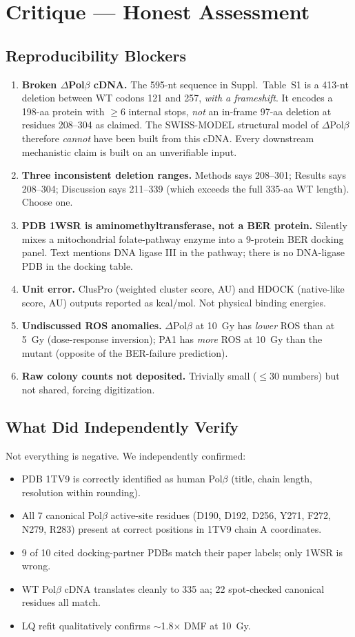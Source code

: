 \documentclass[11pt]{article}
\begin{document}
\section{Critique --- Honest Assessment}
\subsection{Reproducibility Blockers}
\begin{enumerate}
  \item \textbf{Broken $\Delta$Pol$\beta$ cDNA.} The 595-nt sequence in Suppl.\ Table~S1 is a 413-nt deletion between WT codons 121 and 257, \emph{with a frameshift}. It encodes a 198-aa protein with $\geq 6$ internal stops, \emph{not} an in-frame 97-aa deletion at residues 208--304 as claimed. The SWISS-MODEL structural model of $\Delta$Pol$\beta$ therefore \emph{cannot} have been built from this cDNA. Every downstream mechanistic claim is built on an unverifiable input.
  \item \textbf{Three inconsistent deletion ranges.} Methods says 208--301; Results says 208--304; Discussion says 211--339 (which exceeds the full 335-aa WT length). Choose one.
  \item \textbf{PDB 1WSR is aminomethyltransferase, not a BER protein.} Silently mixes a mitochondrial folate-pathway enzyme into a 9-protein BER docking panel. Text mentions DNA ligase III in the pathway; there is no DNA-ligase PDB in the docking table.
  \item \textbf{Unit error.} ClusPro (weighted cluster score, AU) and HDOCK (native-like score, AU) outputs reported as kcal/mol. Not physical binding energies.
  \item \textbf{Undiscussed ROS anomalies.} $\Delta$Pol$\beta$ at 10~Gy has \emph{lower} ROS than at 5~Gy (dose-response inversion); PA1 has \emph{more} ROS at 10~Gy than the mutant (opposite of the BER-failure prediction).
  \item \textbf{Raw colony counts not deposited.} Trivially small ($\leq$30 numbers) but not shared, forcing digitization.
\end{enumerate}

\subsection{What Did Independently Verify}
Not everything is negative. We independently confirmed:
\begin{itemize}
  \item PDB 1TV9 is correctly identified as human Pol$\beta$ (title, chain length, resolution within rounding).
  \item All 7 canonical Pol$\beta$ active-site residues (D190, D192, D256, Y271, F272, N279, R283) present at correct positions in 1TV9 chain A coordinates.
  \item 9 of 10 cited docking-partner PDBs match their paper labels; only 1WSR is wrong.
  \item WT Pol$\beta$ cDNA translates cleanly to 335 aa; 22 spot-checked canonical residues all match.
  \item LQ refit qualitatively confirms $\sim$1.8$\times$ DMF at 10~Gy.
\end{itemize}
\end{document}
